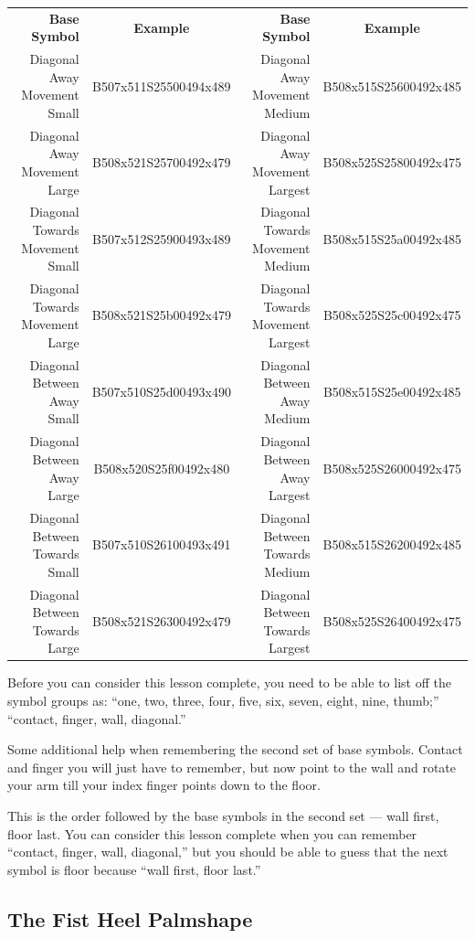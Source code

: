 \documentclass{article}
\begin{document}
\begin{center}
\begin{tabular}{rcrc}
\textbf{Base Symbol}&\textbf{Example}&\textbf{Base Symbol}&\textbf{Example}\\
Diagonal Away Movement Small   &B507x511S25500494x489&Diagonal Away Movement Medium    &B508x515S25600492x485\\
Diagonal Away Movement Large   &B508x521S25700492x479&Diagonal Away Movement Largest   &B508x525S25800492x475\\
Diagonal Towards Movement Small&B507x512S25900493x489&Diagonal Towards Movement Medium &B508x515S25a00492x485\\
Diagonal Towards Movement Large&B508x521S25b00492x479&Diagonal Towards Movement Largest&B508x525S25c00492x475\\
Diagonal Between Away Small    &B507x510S25d00493x490&Diagonal Between Away Medium     &B508x515S25e00492x485\\
Diagonal Between Away Large    &B508x520S25f00492x480&Diagonal Between Away Largest    &B508x525S26000492x475\\
Diagonal Between Towards Small &B507x510S26100493x491&Diagonal Between Towards Medium  &B508x515S26200492x485\\
Diagonal Between Towards Large &B508x521S26300492x479&Diagonal Between Towards Largest &B508x525S26400492x475\\
\end{tabular}
\end{center}

Before you can consider this lesson complete, you need to be able to list off the symbol groups as:
``one, two, three, four, five, six, seven, eight, nine, thumb;''
``contact, finger, wall, diagonal.''

Some additional help when remembering the second set of base symbols.
Contact and finger you will just have to remember, but now point to the wall and rotate your arm till your index finger points down to the floor.

This is the order followed by the base symbols in the second set --- wall first, floor last.
You can consider this lesson complete when you can remember ``contact, finger, wall, diagonal,'' but you should be able to guess that the next symbol is floor because ``wall first, floor last.''

\subsection{The Fist Heel Palmshape}
\end{document}
